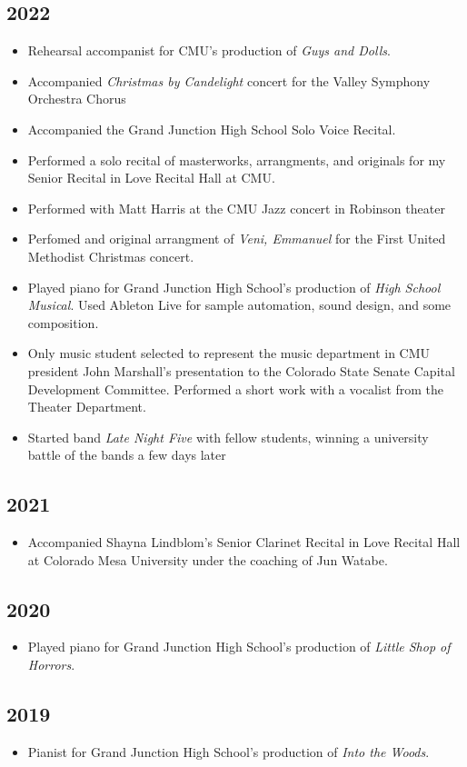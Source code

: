\documentclass{article}
\newcommand{\cvItem}[1]{
        \item {
            {#1}
        }
    }
\newcommand{\cvItemListStart}{\begin{itemize}[leftmargin=10pt]}
\newcommand{\cvItemListEnd}{\end{itemize}}
\begin{document}
        \subsection{2022}
            \cvItemListStart
                \cvItem{Rehearsal accompanist for CMU's production of {\em Guys and Dolls}.}
                \cvItem{Accompanied {\em Christmas by Candelight} concert for the Valley Symphony
                Orchestra Chorus}
                \cvItem{Accompanied the Grand Junction High School Solo Voice Recital.}
                \cvItem{Performed a solo recital of masterworks, arrangments, and originals for my
                Senior Recital in Love Recital Hall at CMU.}
                \cvItem{Performed with Matt Harris at the CMU Jazz concert in Robinson theater}
                \cvItem{Perfomed and original arrangment of {\em Veni, Emmanuel} for the First
                United Methodist Christmas concert.}
                \cvItem{Played piano for Grand Junction High School's production of {\em High School
                Musical}. Used Ableton Live for sample automation, sound design, and some
                composition.}
                \cvItem{Only music student selected to represent the music department in CMU
                president John Marshall's presentation to the Colorado State Senate Capital
                Development Committee. Performed a short work with a vocalist from the Theater
                Department.}
                \cvItem{Started band {\em Late Night Five} with fellow students, winning a
                university battle of the bands a few days later}
            \cvItemListEnd
        \subsection{2021}
            \cvItemListStart
                \cvItem{Accompanied Shayna Lindblom's Senior Clarinet Recital in Love Recital Hall
                at Colorado Mesa University under the coaching of Jun Watabe.}
            \cvItemListEnd
        \subsection{2020}
            \cvItemListStart
                \cvItem{Played piano for Grand Junction High School's production of {\em Little Shop
                of Horrors}.}
            \cvItemListEnd
        \subsection{2019}
            \cvItemListStart
                \cvItem{Pianist for Grand Junction High School's production of {\em Into the
                Woods}.}
            \cvItemListEnd
\end{document}

